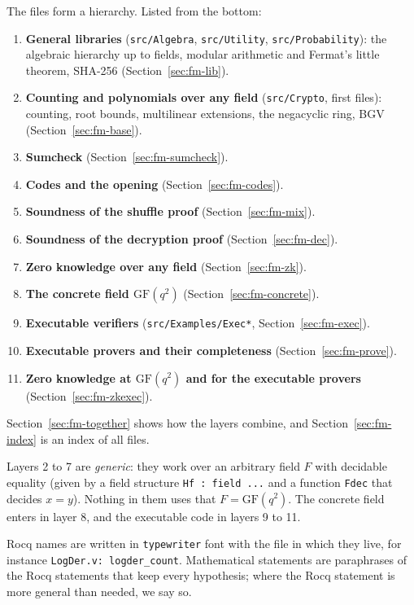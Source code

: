 \documentclass[11pt,a4paper]{article}
\theoremstyle{definition}
\theoremstyle{plain}
\begin{document}
The files form a hierarchy. Listed from the bottom:
\begin{enumerate}[leftmargin=1.6em,itemsep=1pt]
\item \textbf{General libraries} (\texttt{src/Algebra}, \texttt{src/Utility},
  \texttt{src/Probability}): the algebraic hierarchy up to fields, modular arithmetic and Fermat's
  little theorem, SHA-256 (Section~\ref{sec:fm-lib}).
\item \textbf{Counting and polynomials over any field} (\texttt{src/Crypto}, first files):
  counting, root bounds, multilinear extensions, the negacyclic ring, BGV
  (Section~\ref{sec:fm-base}).
\item \textbf{Sumcheck} (Section~\ref{sec:fm-sumcheck}).
\item \textbf{Codes and the opening} (Section~\ref{sec:fm-codes}).
\item \textbf{Soundness of the shuffle proof} (Section~\ref{sec:fm-mix}).
\item \textbf{Soundness of the decryption proof} (Section~\ref{sec:fm-dec}).
\item \textbf{Zero knowledge over any field} (Section~\ref{sec:fm-zk}).
\item \textbf{The concrete field $\mathrm{GF}(q^2)$} (Section~\ref{sec:fm-concrete}).
\item \textbf{Executable verifiers} (\texttt{src/Examples/Exec*}, Section~\ref{sec:fm-exec}).
\item \textbf{Executable provers and their completeness} (Section~\ref{sec:fm-prove}).
\item \textbf{Zero knowledge at $\mathrm{GF}(q^2)$ and for the executable provers}
  (Section~\ref{sec:fm-zkexec}).
\end{enumerate}
Section~\ref{sec:fm-together} shows how the layers combine, and Section~\ref{sec:fm-index} is an
index of all files.

Layers 2 to 7 are \emph{generic}: they work over an arbitrary field $F$ with decidable equality
(given by a field structure \texttt{Hf : field ...} and a function \texttt{Fdec} that decides
$x=y$). Nothing in them uses that $F=\mathrm{GF}(q^2)$. The concrete field enters in layer 8, and
the executable code in layers 9 to 11.

\begin{caution}[Names]
Rocq names are written in \texttt{typewriter} font with the file in which they live, for instance
\texttt{LogDer.v: logder\_count}. Mathematical statements are paraphrases of the Rocq statements
that keep every hypothesis; where the Rocq statement is more general than needed, we say so.
\end{caution}
\end{document}
